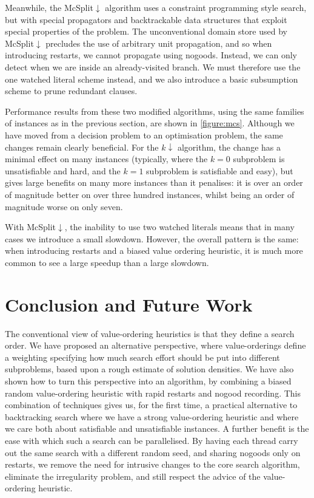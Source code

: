 \documentclass[runningheads]{llncs}
\begin{document}
Meanwhile, the McSplit${\downarrow}$ algorithm
\cite{DBLP:conf/ijcai/McCreeshPT17} uses a constraint programming style search, but with special
propagators and backtrackable data structures that exploit special properties of the problem. The
unconventional domain store used by McSplit${\downarrow}$ precludes the use of arbitrary unit
propagation, and so when introducing restarts, we cannot propagate using nogoods.  Instead, we can
only detect when we are inside an already-visited branch.  We must therefore use the one watched
literal scheme instead, and we also introduce a basic subsumption scheme to prune redundant clauses.

Performance results from these two modified algorithms, using the same families of instances as in
the previous section, are shown in \cref{figure:mcs}. Although we have
moved from a decision problem to an optimisation problem, the same changes remain clearly
beneficial. For the $k{\downarrow}$ algorithm, the change has a minimal effect on many instances
(typically, where the $k = 0$ subproblem is unsatisfiable and hard, and the $k = 1$ subproblem is
satisfiable and easy), but gives large benefits on many more instances than it penalises: it is over
an order of magnitude better on over three hundred instances, whilst being an order of magnitude worse
on only seven.

With McSplit${\downarrow}$, the inability to use two watched literals means that in many cases we
introduce a small slowdown. However, the overall pattern is the same: when introducing restarts and
a biased value ordering heuristic, it is much more common to see a large speedup than a large
slowdown.

\section{Conclusion and Future Work}

The conventional view of value-ordering heuristics is that they define a search order. We have
proposed an alternative perspective, where value-orderings define a weighting specifying how much
search effort should be put into different subproblems, based upon a rough estimate of solution
densities. We have also shown how to turn this perspective into an algorithm, by combining a biased
random value-ordering heuristic with rapid restarts and nogood recording. This combination of
techniques gives us, for the first time, a practical alternative to backtracking search where we
have a strong value-ordering heuristic and where we care both about satisfiable and unsatisfiable
instances.  A further benefit is the ease with which such a search can be parallelised. By having
each thread carry out the same search with a different random seed, and sharing nogoods only on
restarts, we remove the need for intrusive changes to the core search algorithm, eliminate the
irregularity problem, and still respect the advice of the value-ordering heuristic.
\end{document}
